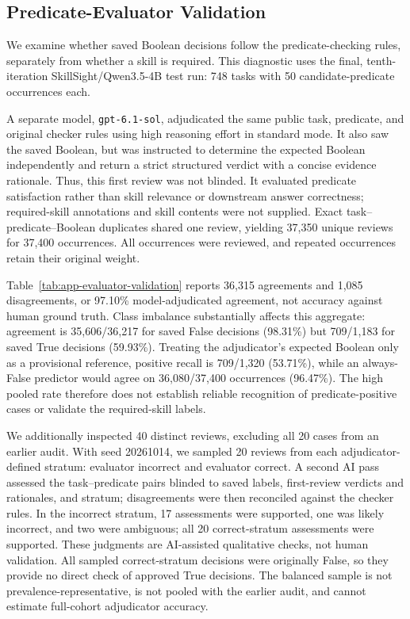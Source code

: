 \subsection{Predicate-Evaluator Validation}
\label{app:evaluator-validation}
We examine whether saved Boolean decisions follow the predicate-checking rules, separately from whether a skill is required. This diagnostic uses the final, tenth-iteration SkillSight/Qwen3.5-4B test run: 748 tasks with 50 candidate-predicate occurrences each.

A separate model, \texttt{gpt-6.1-sol}, adjudicated the same public task, predicate, and original checker rules using high reasoning effort in standard mode. It also saw the saved Boolean, but was instructed to determine the expected Boolean independently and return a strict structured verdict with a concise evidence rationale. Thus, this first review was not blinded. It evaluated predicate satisfaction rather than skill relevance or downstream answer correctness; required-skill annotations and skill contents were not supplied. Exact task--predicate--Boolean duplicates shared one review, yielding 37,350 unique reviews for 37,400 occurrences. All occurrences were reviewed, and repeated occurrences retain their original weight.



Table~\ref{tab:app-evaluator-validation} reports 36,315 agreements and 1,085 disagreements, or 97.10\% model-adjudicated agreement, not accuracy against human ground truth. Class imbalance substantially affects this aggregate: agreement is 35,606/36,217 for saved False decisions (98.31\%) but 709/1,183 for saved True decisions (59.93\%). Treating the adjudicator's expected Boolean only as a provisional reference, positive recall is 709/1,320 (53.71\%), while an always-False predictor would agree on 36,080/37,400 occurrences (96.47\%). The high pooled rate therefore does not establish reliable recognition of predicate-positive cases or validate the required-skill labels.

We additionally inspected 40 distinct reviews, excluding all 20 cases from an earlier audit. With seed 20261014, we sampled 20 reviews from each adjudicator-defined stratum: evaluator incorrect and evaluator correct. A second AI pass assessed the task--predicate pairs blinded to saved labels, first-review verdicts and rationales, and stratum; disagreements were then reconciled against the checker rules. In the incorrect stratum, 17 assessments were supported, one was likely incorrect, and two were ambiguous; all 20 correct-stratum assessments were supported. These judgments are AI-assisted qualitative checks, not human validation. All sampled correct-stratum decisions were originally False, so they provide no direct check of approved True decisions. The balanced sample is not prevalence-representative, is not pooled with the earlier audit, and cannot estimate full-cohort adjudicator accuracy.
